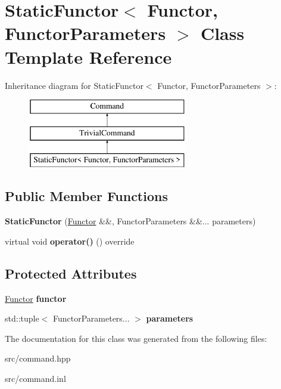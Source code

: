 \hypertarget{class_static_functor}{}\section{Static\+Functor$<$ Functor, Functor\+Parameters $>$ Class Template Reference}
\label{class_static_functor}
Inheritance diagram for Static\+Functor$<$ Functor, Functor\+Parameters $>$\+:\begin{figure}[H]
\begin{center}
\leavevmode
\includegraphics[height=3.000000cm]{class_static_functor}
\end{center}
\end{figure}
\subsection*{Public Member Functions}
\begin{DoxyCompactItemize}
\item 
\mbox{\label{class_static_functor_a5b9d8e265d36df933f9fbfb51d1edf32}} 
{\bfseries Static\+Functor} (\mbox{\hyperlink{class_functor}{Functor}} \&\&, Functor\+Parameters \&\&... parameters)
\item 
\mbox{\label{class_static_functor_a1d8fe0ec2f9965c5f95ad182a8df510b}} 
virtual void {\bfseries operator()} () override
\end{DoxyCompactItemize}
\subsection*{Protected Attributes}
\begin{DoxyCompactItemize}
\item 
\mbox{\label{class_static_functor_aea8563c235a2dea8474da84504c51b58}} 
\mbox{\hyperlink{class_functor}{Functor}} {\bfseries functor}
\item 
\mbox{\label{class_static_functor_aaa5d69cb0c000ea6c4846296de2c7f7f}} 
std\+::tuple$<$ Functor\+Parameters... $>$ {\bfseries parameters}
\end{DoxyCompactItemize}


The documentation for this class was generated from the following files\+:\begin{DoxyCompactItemize}
\item 
src/command.\+hpp\item 
src/command.\+inl\end{DoxyCompactItemize}
